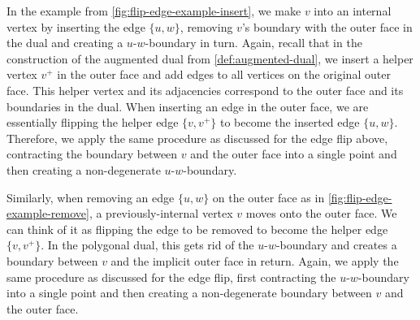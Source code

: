 In the example from \cref{fig:flip-edge-example-insert}, we make $v$ into an internal vertex by inserting the edge $\{u,w\}$, removing $v$'s boundary with the outer face in the dual and creating a $u$-$w$-boundary in turn.
Again, recall that in the construction of the augmented dual from \cref{def:augmented-dual}, we insert a helper vertex $v^+$ in the outer face and add edges to all vertices on the original outer face.
This helper vertex and its adjacencies correspond to the outer face and its boundaries in the dual.
When inserting an edge in the outer face, we are essentially flipping the helper edge $\{v,v^+\}$ to become the inserted edge $\{u,w\}$.
Therefore, we apply the same procedure as discussed for the edge flip above, contracting the boundary between $v$ and the outer face into a single point and then creating a non-degenerate $u$-$w$-boundary.

Similarly, when removing an edge $\{u,w\}$ on the outer face as in \cref{fig:flip-edge-example-remove}, a previously-internal vertex $v$ moves onto the outer face.
We can think of it as flipping the edge to be removed to become the helper edge $\{v,v^+\}$.
In the polygonal dual, this gets rid of the $u$-$w$-boundary and creates a boundary between $v$ and the implicit outer face in return.
Again, we apply the same procedure as discussed for the edge flip, first contracting the $u$-$w$-boundary into a single point and then creating a non-degenerate boundary between $v$ and the outer face.
